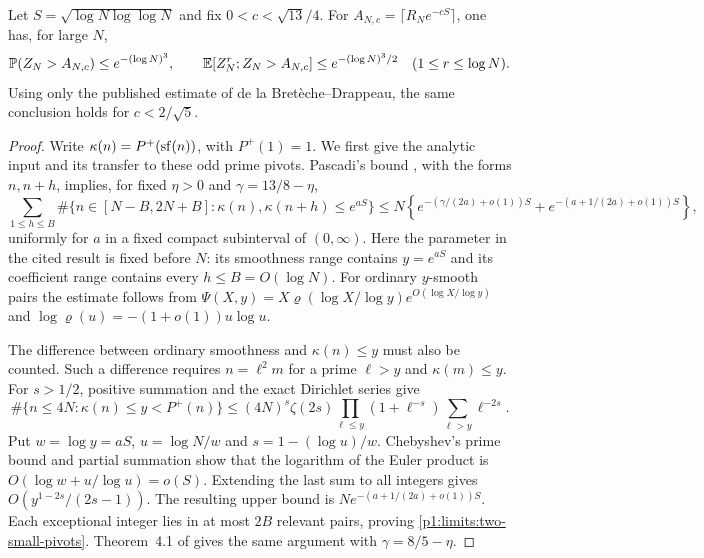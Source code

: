 \begin{proposition}
\label{p1:limits:colored-tail}
Let $S=\sqrt{\log N\log\log N}$ and fix
$0<c<\sqrt{13}/4$.  For
$A_{N,c}=\lceil R_Ne^{-cS}\rceil$, one has, for large $N$,
\begin{equation}
 \P(Z_N>A_{N,c})\le e^{-(\log N)^3},\qquad
 \E[Z_N^r;Z_N>A_{N,c}]\le e^{-(\log N)^3/2}
       \quad(1\le r\le\log N).
 \label{p1:limits:colored-tail-bound}
\end{equation}
Using only the published estimate of de la Bret\`eche--Drappeau,
the same conclusion holds for $c<2/\sqrt5$.
\end{proposition}
\begin{proof}
Write $\kappa(n)=P^+(\sf(n))$, with $P^+(1)=1$.
We first give the analytic input and its transfer to these odd
prime pivots.  Pascadi's bound \cite[Corollary~7.2]{pascadi2025},
with the forms $n,n+h$, implies, for fixed $\eta>0$ and
$\gamma=13/8-\eta$,
\begin{equation}
 \sum_{1\le h\le B}
 \#\{n\in[N-B,2N+B]:\kappa(n),\kappa(n+h)\le e^{aS}\}
 \le N\left\{
 e^{-(\gamma/(2a)+o(1))S}
       +e^{-(a+1/(2a)+o(1))S}\right\},
 \label{p1:limits:two-small-pivots}
\end{equation}
uniformly for $a$ in a fixed compact subinterval of $(0,\infty)$.
Here the parameter in the cited result is fixed before $N$:
its smoothness range contains $y=e^{aS}$ and its coefficient
range contains every $h\le B=O(\log N)$.
For ordinary $y$-smooth pairs the estimate follows from
$\Psi(X,y)=X\varrho(\log X/\log y)e^{O(\log X/\log y)}$
and $\log\varrho(u)=-(1+o(1))u\log u$.

The difference between ordinary smoothness and
$\kappa(n)\le y$ must also be counted.  Such a difference
requires $n=\ell^2m$ for a prime $\ell>y$ and
$\kappa(m)\le y$.  For $s>1/2$, positive summation and
the exact Dirichlet series give
\[
 \#\{n\le4N:\kappa(n)\le y<P^+(n)\}
 \le(4N)^s\zeta(2s)\prod_{\ell\le y}(1+\ell^{-s})
                          \sum_{\ell>y}\ell^{-2s}.
\]
Put $w=\log y=aS$, $u=\log N/w$ and $s=1-(\log u)/w$.
Chebyshev's prime bound and partial summation show that the
logarithm of the Euler product is
$O(\log w+u/\log u)=o(S)$.  Extending the last sum to all
integers gives $O(y^{1-2s}/(2s-1))$.  The resulting upper bound
is $N e^{-(a+1/(2a)+o(1))S}$.  Each exceptional integer lies
in at most $2B$ relevant pairs, proving
\eqref{p1:limits:two-small-pivots}.  Theorem~4.1 of
\cite{bretedrappeau2020} gives the same argument with
$\gamma=8/5-\eta$.


\end{proof}
